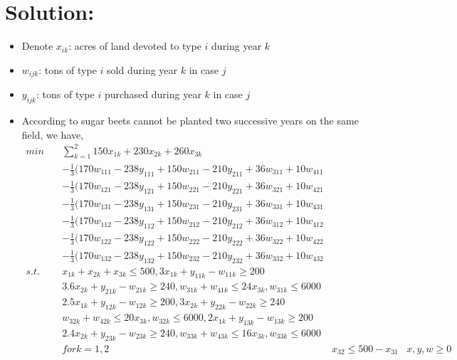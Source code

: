 \documentclass{article}
\theoremstyle{definition}
\theoremstyle{definition}
\theoremstyle{remark}
\begin{document}
\section*{Solution:}
\begin{itemize}
\item Denote $x_{ik}$: acres of land devoted to type $i$ during year $k$
\item $w_{ijk}$: tons of type $i$ sold during year $k$ in case $j$
\item $y_{ijk}$: tons of type $i$ purchased during year $k$ in case $j$
\item According to sugar beets cannot be planted two successive years on the same field, we have,
\begin{equation}
\begin{aligned}
min \quad &\sum_{k=1}^2 150x_{1k}+230x_{2k}+260x_{3k} \\                                                                      
& -\frac{1}{3}(170w_{111}-238y_{111}+150w_{211}-210y_{211}+36w_{311}+10w_{411} \\
& -\frac{1}{3}(170w_{121}-238y_{121}+150w_{221}-210y_{221}+36w_{321}+10w_{421} \\
& -\frac{1}{3}(170w_{131}-238y_{131}+150w_{231}-210y_{231}+36w_{331}+10w_{431} \\
& -\frac{1}{3}(170w_{112}-238y_{112}+150w_{212}-210y_{212}+36w_{312}+10w_{412} \\
& -\frac{1}{3}(170w_{122}-238y_{122}+150w_{222}-210y_{222}+36w_{322}+10w_{422} \\
& -\frac{1}{3}(170w_{132}-238y_{132}+150w_{232}-210y_{232}+36w_{332}+10w_{432} \\ 
s.t. \quad & x_{1k}+x_{2k}+x_{3k}\leq500,3x_{1k}+y_{11k}-w_{11k}\geq200 \\                                 
& 3.6x_{2k}+y_{21k}-w_{21k}\geq240,w_{31k}+w_{41k}\leq24x_{3k},w_{31k}\leq6000 \\
& 2.5x_{1k}+y_{12k}-w_{12k}\geq200,3x_{2k}+y_{22k}-w_{22k}\geq240 \\               
& w_{32k}+w_{42k}\leq20x_{3k},w_{32k}\leq6000,2x_{1k}+y_{13k}-w_{13k}\geq200 \\
& 2.4x_{2k}+y_{23k}-w_{23k}\geq240,w_{33k}+w_{43k}\leq16x_{3k},w_{33k}\leq6000 \\
& for k=1,2
& x_{32}\leq500-x_{31}
& x,y,w\geq0
\end{aligned}
\end{equation}
\end{itemize}
\end{document}
